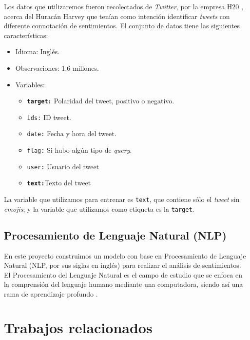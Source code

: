 \documentclass[sigconf, nonacm, spanish]{acmart}
\begin{document}
Los datos que utilizaremos fueron recolectados de \textit{Twitter}, por la empresa H20 \cite{H20}, acerca del Huracán Harvey que tenían como intención identificar \textit{tweets} con diferente connotación de sentimientos. El conjunto de datos tiene las siguientes características:
\begin{itemize}
\item Idioma: Inglés.
\item Observaciones: 1.6 millones.
\item Variables: 
    \begin{itemize}
    \item \textbf{\texttt{target:}} Polaridad del tweet, positivo o negativo. 
    \item \texttt{ids:} ID tweet.
    \item \texttt{date:} Fecha y hora del tweet.
    \item \texttt{flag:} Si hubo algún tipo de \textit{query}.
    \item \texttt{user:} Usuario del tweet
    \item \textbf{\texttt{text:}}Texto del tweet
    \end{itemize}
\end{itemize}

La variable que utilizamos para entrenar es \texttt{text}, que contiene sólo el \textit{tweet} sin \textit{emojis}; y la variable que utilizamos como etiqueta es la \texttt{target}.

\subsection{Procesamiento de Lenguaje Natural (NLP)}
En este proyecto construimos un modelo con base en Procesamiento de Lenguaje Natural (NLP, por sus siglas en inglés) para realizar el análisis de sentimientos. El Procesamiento del Lenguaje Natural es el campo de estudio que se enfoca en la comprensión del lenguaje humano mediante una computadora, siendo así una rama de aprendizaje profundo \cite{notas_clase}.

\section{Trabajos relacionados}
\end{document}
